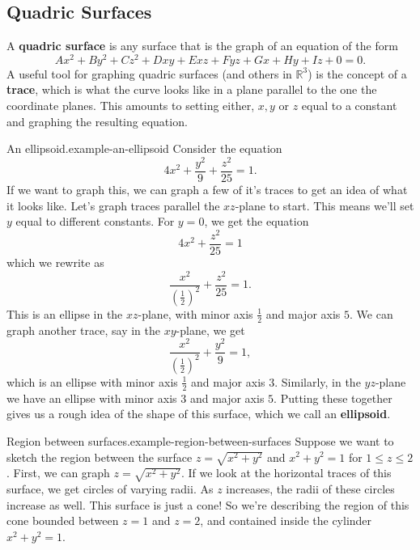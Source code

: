 \documentclass[10pt,]{book}
\newcommand{\terminology}[1]{\textbf{#1}}
\numberwithin{equation}{section}
\newcommand{\RR}{\mathbb{R}}
\begin{document}
\subsection[{Quadric Surfaces}]{Quadric Surfaces}\label{subsection-quadric-surfaces}
\hypertarget{p-1241}{}%
A \terminology{quadric surface} is any surface that is the graph of an equation of the form%
%
\begin{equation*}
Ax^{2}+By^{2}+Cz^{2}+Dxy+Exz+Fyz+Gx+Hy+Iz+0 = 0.
\end{equation*}
\hypertarget{p-1242}{}%
A useful tool for graphing quadric surfaces (and others in \(\RR^{3}\)) is the concept of a \terminology{trace}, which is what the curve looks like in a plane parallel to the one the coordinate planes. This amounts to setting either, \(x,y\) or \(z\) equal to a constant and graphing the resulting equation.%
\begin{example}{An ellipsoid.}{example-an-ellipsoid}%
\hypertarget{p-1243}{}%
Consider the equation%
%
\begin{equation*}
4x^{2}+\frac{y^{2}}{9}+\frac{z^{2}}{25} = 1.
\end{equation*}
\hypertarget{p-1244}{}%
If we want to graph this, we can graph a few of it's traces to get an idea of what it looks like. Let's graph traces parallel the \(xz\)-plane to start. This means we'll set \(y\) equal to different constants. For \(y=0\), we get the equation%
%
\begin{equation*}
4x^{2}+\frac{z^{2}}{25} = 1
\end{equation*}
\hypertarget{p-1245}{}%
which we rewrite as%
%
\begin{equation*}
\frac{x^{2}}{(\frac{1}{2})^{2}}+\frac{z^{2}}{25} = 1.
\end{equation*}
\hypertarget{p-1246}{}%
This is an ellipse in the \(xz\)-plane, with minor axis \(\frac{1}{2}\) and major axis \(5\). We can graph another trace, say in the \(xy\)-plane, we get%
%
\begin{equation*}
\frac{x^{2}}{(\frac{1}{2})^{2}}+\frac{y^{2}}{9} = 1,
\end{equation*}
\hypertarget{p-1247}{}%
which is an ellipse with minor axis \(\frac{1}{2}\) and major axis \(3\). Similarly, in the \(yz\)-plane we have an ellipse with minor axis \(3\) and major axis \(5\). Putting these together gives us a rough idea of the shape of this surface, which we call an \terminology{ellipsoid}.%
\end{example}
\begin{example}{Region between surfaces.}{example-region-between-surfaces}%
\hypertarget{p-1248}{}%
Suppose we want to sketch the region between the surface \(z=\sqrt{x^{2}+y^{2}}\) and \(x^{2}+y^{2}=1\) for \(1\leq z\leq 2\). First, we can graph \(z=\sqrt{x^{2}+y^{2}}\). If we look at the horizontal traces of this surface, we get circles of varying radii. As \(z\) increases, the radii of these circles increase as well. This surface is just a cone! So we're describing the region of this cone bounded between \(z=1\) and \(z=2\), and contained inside the cylinder \(x^{2}+y^{2}=1\).%
\end{example}
\end{document}
